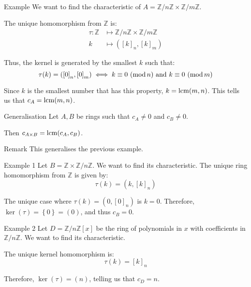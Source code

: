 \documentclass[a4paper]{article}
\begin{document}
\begin{parag}{Example}
    We want to find the characteristic of $A = \mathbb{Z}/n\mathbb{Z} \times \mathbb{Z}/m\mathbb{Z}$.

    The unique homomorphism from $\mathbb{Z}$ is:
    \[\begin{split}
    \tau: \mathbb{Z} &\longmapsto \mathbb{Z}/n\mathbb{Z} \times \mathbb{Z}/m\mathbb{Z} \\
    k &\longmapsto \left(\left[k\right]_n, \left[k\right]_m\right)
    \end{split}\]
    
    Thus, the kernel is generated by the smallest $k$ such that: 
    \[\tau\left(k\right) = \left(\left[0\right]_n, \left[0\right]_m\right) \iff \congruent{k}{0}{n} \text{ and } \congruent{k}{0}{m}\]

    Since $k$ is the smallest number that has this property, $k = \lcm\left(m, n\right)$. This tells us that $c_A = \lcm\left(m, n\right)$.
\end{parag}

\begin{parag}{Generalisation}
    Let $A, B$ be rings such that $c_A \neq 0$ and $c_B \neq 0$.

    Then $c_{A \times B} = \lcm\left(c_A, c_B\right)$.

    \begin{subparag}{Remark}
        This generalises the previous example.
    \end{subparag}
\end{parag}

\begin{parag}{Example 1}
    Let $B = \mathbb{Z} \times \mathbb{Z}/n\mathbb{Z}$. We want to find its characteristic. The unique ring homomorphism from $\mathbb{Z}$ is given by: 
    \[\tau\left(k\right) = \left(k, \left[k\right]_n\right)\]
    
    The unique case where $\tau\left(k\right) = \left(0, \left[0\right]_n\right)$ is $k = 0$. Therefore, $\ker\left(\tau\right) = \left\{0\right\} = \left(0\right)$, and thus $c_B = 0$.
\end{parag}

\begin{parag}{Example 2}
    Let $D = \mathbb{Z}/n\mathbb{Z}\left[x\right]$ be the ring of polynomials in $x$ with coefficients in $\mathbb{Z}/n\mathbb{Z}$. We want to find its characteristic.

    The unique kernel homomorphism is: 
    \[\tau\left(k\right) = \left[k\right]_n\]
    
    Therefore, $\ker\left(\tau\right) = \left(n\right)$, telling us that $c_D = n$.
\end{parag}
\end{document}
